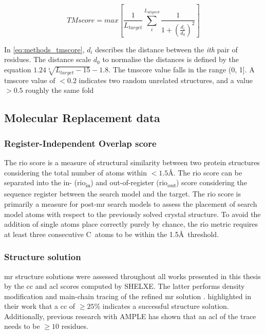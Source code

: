 \begin{equation}
    TMscore=max\left[\frac{1}{L_{target}}\sum_{i}^{L_{aligned}}{\frac{1}{1+\left(\frac{d_i}{d_0}\right)^2}}\right]
    \label{eq:methods_tmscore}
\end{equation}

In \cref{eq:methods_tmscore}, $d_i$ describes the distance between the \textit{ith} pair of residues. The distance scale $d_0$ to normalise the distances is defined by the equation $1.24\sqrt[3]{L_{target}-15}-1.8$. The \gls{tmscore} value falls in the range (0, 1]. A \gls{tmscore} value of $<0.2$ indicates two random unrelated structures, and a value $>0.5$ roughly the same fold \cite{Xu2010-kr}

\subsection{Molecular Replacement data}
\subsubsection{Register-Independent Overlap score} \label{sec:methods_rio}
The \gls{rio} score \cite{Thomas2015-wu} is a measure of structural similarity between two protein structures considering the total number of atoms within $<1.5$\AA. The \gls{rio} score can be separated into the in- (\gls{rio}\textsubscript{in}) and out-of-register (\gls{rio}\textsubscript{out}) score considering the sequence register between the search model and the target. The \gls{rio} score is primarily a measure for post-\gls{mr} search models to assess the placement of search model atoms with respect to the previously solved crystal structure. To avoid the addition of single atoms place correctly purely by chance, the \gls{rio} metric requires at least three consecutive C\textalpha\ atoms to be within the 1.5\AA\ threshold.

\subsubsection{Structure solution} \label{sec:methods_mr_success}
\gls{mr} structure solutions were assessed throughout all works presented in this thesis by the \gls{cc} \cite{Fujinaga1987-vh} and \gls{acl} scores computed by SHELXE. The latter performs density modification and main-chain tracing of the refined \gls{mr} solution \cite{Thorn2013-le}. \textcite{Thorn2013-le} highlighted in their work that a \gls{cc} of $\geq25$\% indicates a successful structure solution. Additionally, previous research with AMPLE \cite{Thomas2015-wu} has shown that an \gls{acl} of the trace needs to be $\geq10$ residues.

